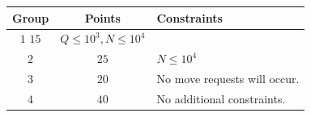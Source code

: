 
\begin{center}
\begin{tabular}{| c | c | l |}
  \hline
  \textbf{Group} & \textbf{Points} & \textbf{Constraints} \\ \hline
  $1$     $15$  & $Q \le 10^3, N \le 10^4$ \\ \hline
  $2$    & $25$  & $N \le 10^4$ \\ \hline
  $3$    & $20$  & No move requests will occur. \\ \hline
  $4$    & $40$  & No additional constraints. \\ \hline
\end{tabular}
\end{center}
